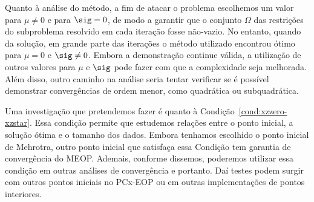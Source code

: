 Quanto à análise do método, a fim de atacar o problema escolhemos um valor para $\mu\neq 0$ e para $\sig = 0$, de modo a garantir que o conjunto $\Omega$ das restrições do subproblema resolvido em cada iteração fosse não-vazio.  No entanto, quando da solução, em grande parte das iterações o método utilizado encontrou ótimo para $\mu=0$ e $\sig\neq 0$. Embora a demonstração continue válida, a utilização de outros valores para $\mu$ e $\sig$ pode fazer com que a complexidade seja melhorada. Além disso, outro caminho na análise seria tentar verificar se é possível demonstrar convergências de ordem menor, como quadrática ou subquadrática. 

Uma investigação  que pretendemos fazer é quanto à Condição~\ref{cond:xzzero-xzstar}. Essa condição permite que estudemos relações entre o ponto inicial, a solução ótima e o tamanho dos dados. Embora tenhamos escolhido o ponto inicial de Mehrotra, outro ponto inicial que satisfaça essa Condição tem garantia de convergência do MEOP. Ademais, conforme dissemos, poderemos utilizar essa condição em outras análises de convergência e portanto. Daí testes podem surgir com outros pontos iniciais no PCx-EOP ou em outras implementações de pontos interiores.




